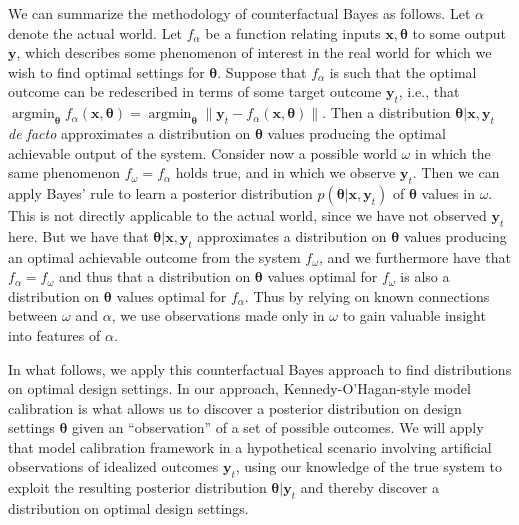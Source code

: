 \documentclass[twocolumn,10pt]{asme2ej}
\DeclareMathOperator*{\argmin}{argmin}
\begin{document}
%
We can summarize the methodology of counterfactual Bayes as follows.
%
Let $\alpha$ denote the actual world. 
%
Let $f_\alpha$ be a function relating inputs $\mathbf x,\boldsymbol \theta$ to some output $\mathbf y$, which describes some phenomenon of interest in the real world for which we wish to find optimal settings for $\boldsymbol\theta$. 
%
Suppose that $f_\alpha$ is such that the optimal outcome can be redescribed in terms of some target outcome $\mathbf y_t$, i.e., that $\argmin_{\boldsymbol\theta} f_\alpha(\mathbf x,\boldsymbol \theta)=\argmin_{\boldsymbol\theta} \lVert \mathbf y_{t} - f_\alpha(\mathbf x,\boldsymbol\theta)\rVert$. 
%
Then a distribution $\boldsymbol\theta|\mathbf x,\mathbf y_{t}$ \textit{de facto} approximates a distribution on $\boldsymbol\theta$ values producing the optimal achievable output of the system. 
%
%
Consider now a possible world $\omega$ in which the same phenomenon $f_\omega=f_\alpha$ holds true, and in which we observe $\mathbf y_{t}$. 
%
Then we can apply Bayes' rule to learn a posterior distribution $p(\boldsymbol\theta|\mathbf x,\mathbf y_{t})$ of $\boldsymbol \theta$ values in $\omega$. 
%
This is not directly applicable to the actual world, since we have not observed $\mathbf y_{t}$ here. 
%
But we have that $\boldsymbol\theta|\mathbf x,\mathbf y_{t}$ approximates a distribution on $\boldsymbol \theta$ values producing an optimal achievable outcome from the system $f_\omega$, and we furthermore have that $f_\alpha=f_\omega$ and thus that a distribution on $\boldsymbol \theta$ values optimal for $f_\omega$ is also a distribution on $\boldsymbol \theta$ values optimal for $f_\alpha$. 
%
Thus by relying on known connections between $\omega$ and $\alpha$, we use observations made only in $\omega$ to gain valuable insight into features of $\alpha$.
%

%
In what follows, we apply this counterfactual Bayes approach to find distributions on optimal design settings.
%
In our approach, Kennedy-O'Hagan-style model calibration \cite{Kennedy2001} is what allows us to discover a posterior distribution on design settings $\boldsymbol\theta$ given an ``observation'' of a set of possible outcomes.
%
We will apply that model calibration framework in a hypothetical scenario involving artificial observations of idealized outcomes $\mathbf y_t$, using our knowledge of the true system to exploit the resulting posterior distribution $\boldsymbol\theta|\mathbf y_t$ and thereby discover a distribution on optimal design settings.
%
\end{document}
